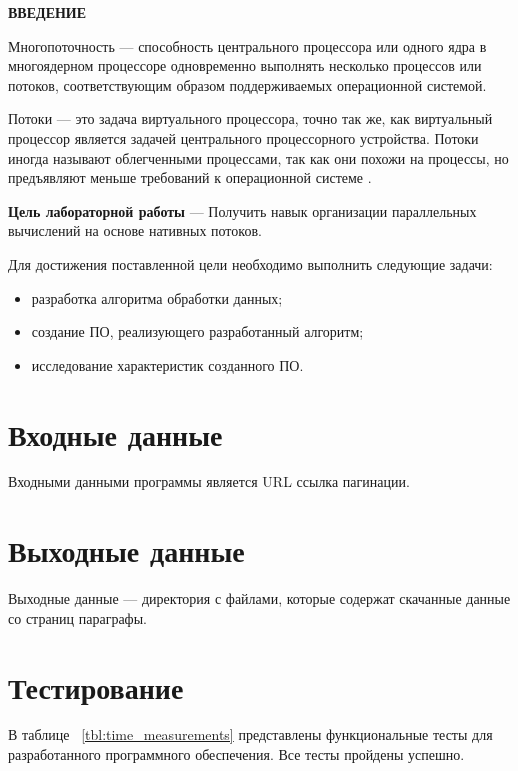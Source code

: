 \begin{center}
    \textbf{ВВЕДЕНИЕ}
\end{center}




Многопоточность --- способность центрального процессора или одного ядра в
многоядерном процессоре одновременно выполнять несколько процессов или
потоков, соответствующим образом поддерживаемых операционной системой.

Потоки --- это задача виртуального процессора, точно так же, как
виртуальный процессор является задачей центрального процессорного устройства.
Потоки иногда называют
облегченными процессами, так как они похожи на процессы, но предъявляют
меньше требований к операционной системе \cite{bib0}.




\textbf{Цель лабораторной работы} --- Получить навык организации параллельных
вычислений на основе нативных потоков.

Для достижения поставленной цели необходимо выполнить следующие задачи:
\begin{itemize}
    \item разработка алгоритма обработки данных;
    \item создание ПО, реализующего разработанный алгоритм;
    \item исследование характеристик созданного ПО.
\end{itemize}


\section{Входные данные}
Входными данными программы является URL ссылка пагинации.


\section{Выходные данные}
Выходные данные --- директория с файлами, которые содержат скачанные данные
со страниц параграфы.

\clearpage

\section{Тестирование}
В таблице ~\ref{tbl:time_measurements} представлены функциональные тесты для разработанного
программного обеспечения. Все тесты пройдены успешно.


